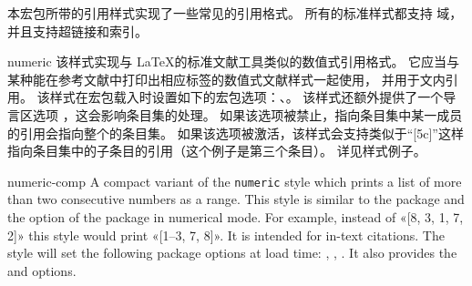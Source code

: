 
本宏包所带的引用样式实现了一些常见的引用格式。
所有的标准样式都支持  域，并且支持超链接和索引。


\begin{marglist}

\item[numeric]
该样式实现与 \LaTeX 的标准文献工具类似的数值式引用格式。
它应当与某种能在参考文献中打印出相应标签的数值式文献样式一起使用，
并用于文内引用。
该样式在宏包载入时设置如下的宏包选项：、。
该样式还额外提供了一个导言区选项 ，这会影响条目集的处理。
如果该选项被禁止，指向条目集中某一成员的引用会指向整个的条目集。
如果该选项被激活，该样式会支持类似于“[5c]”这样指向条目集中的子条目的引用（这个例子是第三个条目）。
详见样式例子。

\item[numeric-comp]
A compact variant of the \texttt{numeric} style which prints a list of more than two consecutive numbers as a range. This style is similar to the  package and the  option of the  package in numerical mode. For example, instead of «[8, 3, 1, 7, 2]» this style would print «[1--3, 7, 8]». It is intended for in-text citations. The style will set the following package options at load time: , , . It also provides the  and  options.


\end{marglist}
